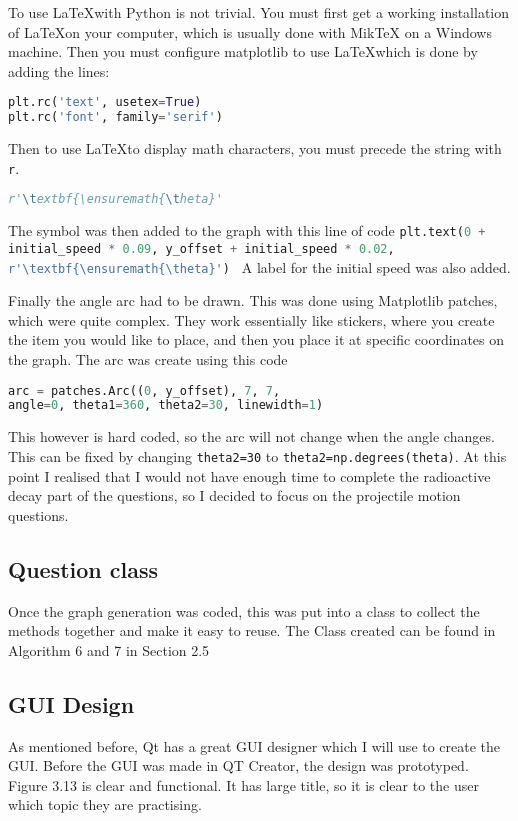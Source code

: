 To use \LaTeX with Python is not trivial. You must first get a working installation of \LaTeX on your computer, which is usually done with MikTeX on a Windows machine. Then you must configure matplotlib to use \LaTeX which is done by adding the lines:
\begin{lstlisting}[language=Python, caption=Requirements for \LaTeX in matplotlib]
plt.rc('text', usetex=True) 
plt.rc('font', family='serif') 
\end{lstlisting}
Then to use \LaTeX to display math characters, you must precede the string with \texttt{r}. 
\begin{lstlisting}[language=Python, caption=String used to display $\theta$ using \LaTeX]
r'\textbf{\ensuremath{\theta}'
\end{lstlisting}
The symbol was then added to the graph with this line of code 
\lstinline[language=Python]|plt.text(0 + initial_speed * 0.09, y_offset + initial_speed * 0.02, r'\textbf{\ensuremath{\theta}') |
A label for the initial speed was also added.

Finally the angle arc had to be drawn. This was done using Matplotlib patches, which were quite complex. They work essentially like stickers, where you create the item you would like to place, and then you place it at specific coordinates on the graph. The arc was create using this code
\begin{lstlisting}[language=Python, caption=Requirements for \LaTeX in matplotlib]
arc = patches.Arc((0, y_offset), 7, 7,
angle=0, theta1=360, theta2=30, linewidth=1)
\end{lstlisting}
This however is hard coded, so the arc will not change when the angle changes. This can be fixed by changing \lstinline|theta2=30| to \lstinline|theta2=np.degrees(theta)|.
At this point I realised that I would not have enough time to complete the radioactive decay part of the questions, so I decided to focus on the projectile motion questions.

\subsection{Question class}
Once the graph generation was coded, this was put into a class to collect the methods together and make it easy to reuse. The Class created can be found in Algorithm 6 and 7 in Section 2.5
\subsection{GUI Design}
As mentioned before, Qt has a great GUI designer which I will use to create the GUI. Before the GUI was made in QT Creator, the design was prototyped.
Figure 3.13 is clear and functional. It has large title, so it is clear to the user which topic they are practising. 
